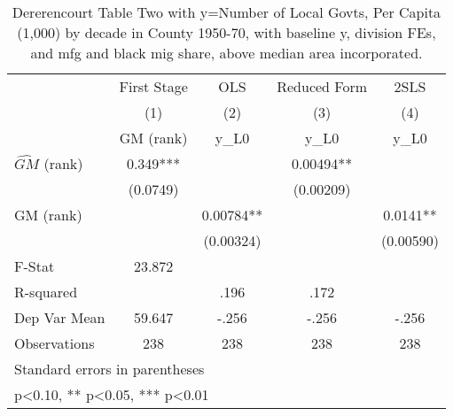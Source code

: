 \begin{table}[htbp]\centering
\def\sym#1{\ifmmode^{#1}\else\(^{#1}\)\fi}
\caption{Dererencourt Table Two with y=Number of Local Govts, Per Capita (1,000) by decade in County 1950-70, with baseline y, division FEs, and mfg and black mig share, above median area incorporated.}
\begin{tabular}{l*{4}{c}}
\toprule
                    & First Stage   &         OLS   &Reduced Form   &        2SLS   \\
                    &\multicolumn{1}{c}{(1)}&\multicolumn{1}{c}{(2)}&\multicolumn{1}{c}{(3)}&\multicolumn{1}{c}{(4)}\\
                    &\multicolumn{1}{c}{GM  (rank)}&\multicolumn{1}{c}{y\_L0}&\multicolumn{1}{c}{y\_L0}&\multicolumn{1}{c}{y\_L0}\\
\midrule
$\hat{GM}$ (rank)   &       0.349***&               &     0.00494** &               \\
                    &    (0.0749)   &               &   (0.00209)   &               \\
\addlinespace
GM  (rank)          &               &     0.00784** &               &      0.0141** \\
                    &               &   (0.00324)   &               &   (0.00590)   \\
\midrule
F-Stat              &      23.872   &               &               &               \\
R-squared           &               &        .196   &        .172   &               \\
Dep Var Mean        &      59.647   &       -.256   &       -.256   &       -.256   \\
Observations        &         238   &         238   &         238   &         238   \\
\bottomrule
\multicolumn{5}{l}{\footnotesize Standard errors in parentheses}\\
\multicolumn{5}{l}{\footnotesize * p<0.10, ** p<0.05, *** p<0.01}\\
\end{tabular}
\end{table}
